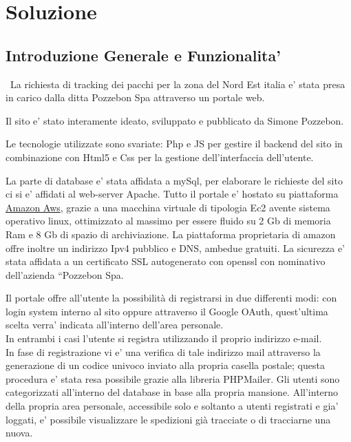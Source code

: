 \documentclass[a4paper, 12pt]{report}
\begin{document}
\section{Soluzione}
\subsection{Introduzione Generale e Funzionalita'}\
La richiesta di tracking dei pacchi per la zona del Nord Est italia e’ stata presa in carico dalla ditta Pozzebon Spa attraverso un portale web. 

Il sito e’ stato interamente ideato, sviluppato e pubblicato da Simone Pozzebon.

Le tecnologie utilizzate sono svariate: Php e JS per gestire il backend del sito in combinazione con Html5 e Css per la gestione dell’interfaccia dell’utente. 

La parte di database e’ stata affidata a mySql, per elaborare le richieste del sito ci si e’ affidati al web-server Apache.
Tutto il portale e’ hostato su piattaforma \href{https://aws.amazon.com/free/?trk=ps_a134p000003yhhNAAQ&trkCampaign=acq_paid_search_brand&sc_channel=ps&sc_campaign=acquisition_IT&sc_publisher=google&sc_category=core&sc_country=IT&sc_geo=EMEA&sc_outcome=Acquisition&sc_detail=amazon%20aws&sc_content=Amazon%20AWS_e&sc_matchtype=e&sc_segment=455721528683&sc_medium=ACQ-P|PS-GO|Brand|Desktop|SU|AWS|Core|IT|EN|Text&s_kwcid=AL!4422!3!455721528683!e!!g!!amazon%20aws&ef_id=CjwKCAjwvMqDBhB8EiwA2iSmPChyXfcgliX39hxNQ-chnJF4pTgh37C5ky8iupvY3PSirs-CU-Xt7xoCjZgQAvD_BwE:G:s&s_kwcid=AL!4422!3!455721528683!e!!g!!amazon%20aws&all-free-tier.sort-by=item.additionalFields.SortRank&all-free-tier.sort-order=asc}{Amazon Aws}, grazie a una macchina virtuale di tipologia Ec2 avente sistema operativo linux, ottimizzato al massimo per essere fluido su 2 Gb di memoria Ram e 8 Gb di spazio di archiviazione.
La piattaforma proprietaria di amazon offre inoltre un indirizzo Ipv4 pubblico e DNS, ambedue gratuiti.
La sicurezza e’ stata affidata a un certificato SSL autogenerato con openssl con nominativo dell’azienda “Pozzebon Spa. 

Il portale offre all’utente la possibilità di registrarsi in due differenti modi: con login system interno al sito oppure attraverso il Google OAuth, quest’ultima scelta verra’ indicata all’interno dell’area personale.
\\In entrambi i casi l’utente si registra utilizzando il proprio indirizzo e-mail.\\
In fase di registrazione vi e’ una verifica di tale indirizzo mail attraverso la generazione di un codice univoco inviato alla propria casella postale; questa procedura e’ stata resa possibile grazie alla libreria PHPMailer.
Gli utenti sono categorizzati all’interno del database in base alla propria mansione.
All’interno della propria area personale, accessibile solo e soltanto a utenti registrati e gia’ loggati, e’ possibile visualizzare le spedizioni già tracciate o di tracciarne una nuova.
\end{document}
